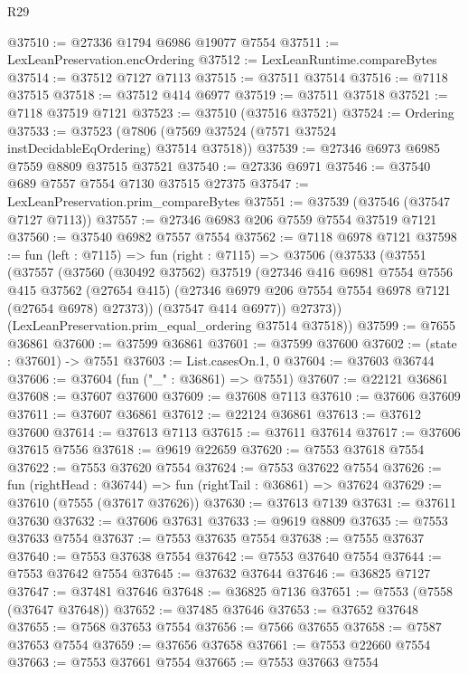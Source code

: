 \begin{lexlean}{R29}
\begin{coremodule}
@37510 := @27336 @1794 @6986 @19077 @7554
@37511 := LexLeanPreservation.encOrdering
@37512 := LexLeanRuntime.compareBytes
@37514 := @37512 @7127 @7113
@37515 := @37511 @37514
@37516 := @7118 @37515
@37518 := @37512 @414 @6977
@37519 := @37511 @37518
@37521 := @7118 @37519 @7121
@37523 := @37510 (@37516 @37521)
@37524 := Ordering
@37533 := @37523 (@7806 (@7569 @37524 (@7571 @37524 instDecidableEqOrdering) @37514 @37518))
@37539 := @27346 @6973 @6985 @7559 @8809 @37515 @37521
@37540 := @27336 @6971
@37546 := @37540 @689 @7557 @7554 @7130 @37515 @27375
@37547 := LexLeanPreservation.prim_compareBytes
@37551 := @37539 (@37546 (@37547 @7127 @7113))
@37557 := @27346 @6983 @206 @7559 @7554 @37519 @7121
@37560 := @37540 @6982 @7557 @7554
@37562 := @7118 @6978 @7121
@37598 := fun (left : @7115) =>
  fun (right : @7115) =>
  @37506
    (@37533
      (@37551
        (@37557
          (@37560
            (@30492 @37562)
            @37519
            (@27346
              @416
              @6981
              @7554
              @7556
              @415
              @37562
              (@27654 @415)
              (@27346 @6979 @206 @7554 @7554 @6978 @7121 (@27654 @6978) @27373))
            (@37547 @414 @6977))
          @27373))
      (LexLeanPreservation.prim_equal_ordering @37514 @37518))
@37599 := @7655 @36861
@37600 := @37599 @36861
@37601 := @37599 @37600
@37602 := (state : @37601) -> @7551
@37603 := List.casesOn.{1, 0}
@37604 := @37603 @36744
@37606 := @37604 (fun ("_" : @36861) => @7551)
@37607 := @22121 @36861
@37608 := @37607 @37600
@37609 := @37608 @7113
@37610 := @37606 @37609
@37611 := @37607 @36861
@37612 := @22124 @36861
@37613 := @37612 @37600
@37614 := @37613 @7113
@37615 := @37611 @37614
@37617 := @37606 @37615 @7556
@37618 := @9619 @22659
@37620 := @7553 @37618 @7554
@37622 := @7553 @37620 @7554
@37624 := @7553 @37622 @7554
@37626 := fun (rightHead : @36744) => fun (rightTail : @36861) => @37624
@37629 := @37610 (@7555 (@37617 @37626))
@37630 := @37613 @7139
@37631 := @37611 @37630
@37632 := @37606 @37631
@37633 := @9619 @8809
@37635 := @7553 @37633 @7554
@37637 := @7553 @37635 @7554
@37638 := @7555 @37637
@37640 := @7553 @37638 @7554
@37642 := @7553 @37640 @7554
@37644 := @7553 @37642 @7554
@37645 := @37632 @37644
@37646 := @36825 @7127
@37647 := @37481 @37646
@37648 := @36825 @7136
@37651 := @7553 (@7558 (@37647 @37648))
@37652 := @37485 @37646
@37653 := @37652 @37648
@37655 := @7568 @37653 @7554
@37656 := @7566 @37655
@37658 := @7587 @37653 @7554
@37659 := @37656 @37658
@37661 := @7553 @22660 @7554
@37663 := @7553 @37661 @7554
@37665 := @7553 @37663 @7554

\end{coremodule}
\end{lexlean}
